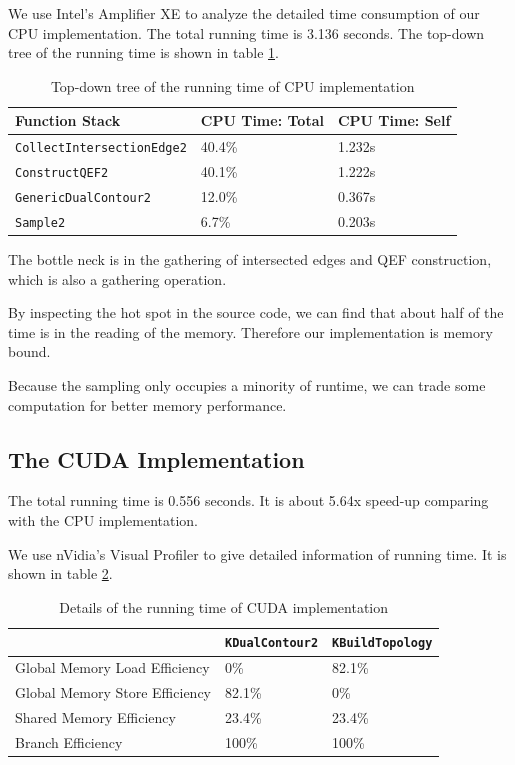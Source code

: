 \documentclass[a4paper,12pt]{article}
\begin{document}
We use Intel's Amplifier XE to analyze the detailed time consumption
of our CPU implementation.
The total running time is 3.136 seconds.
The top-down tree of the running time is shown in table
\ref{tab:dc2-cpu-performance}.

\begin{table}[h]
\centering
\begin{tabular}{| l | l | l |}
\hline
Function Stack & CPU Time: Total & CPU Time: Self\\  \hline
\texttt{CollectIntersectionEdge2} & 40.4\% & 1.232s \\
\texttt{ConstructQEF2} & 40.1\% & 1.222s \\
\texttt{GenericDualContour2} & 12.0\% & 0.367s \\
\texttt{Sample2} & 6.7\% & 0.203s \\
\hline
\end{tabular}
\caption{Top-down tree of the running time of CPU implementation}
\label{tab:dc2-cpu-performance}
\end{table}

The bottle neck is in the gathering of intersected edges and
QEF construction, which is also a gathering operation.

By inspecting the hot spot in the source code,
we can find that about half of the time is in the reading of the memory.
Therefore our implementation is memory bound.

Because the sampling only occupies a minority of runtime,
we can trade some computation for better memory performance.

\subsection{The CUDA Implementation}

The total running time is 0.556 seconds.
It is about 5.64x speed-up comparing with the CPU implementation.

We use nVidia's Visual Profiler to give detailed information of running time.
It is shown in table \ref{tab:cudc2-cuda-performance}.

\begin{table}[h]
\centering
\begin{tabular}{| l | l | l |}
\hline
& \texttt{KDualContour2} & \texttt{KBuildTopology}\\  \hline
Global Memory Load Efficiency & 0\% & 82.1\%\\
Global Memory Store Efficiency & 82.1\% & 0\%\\
Shared Memory Efficiency & 23.4\% & 23.4\%\\
Branch Efficiency & 100\% & 100\%\\
\hline
\end{tabular}
\caption{Details of the running time of CUDA implementation}
\label{tab:cudc2-cuda-performance}
\end{table}
\end{document}
